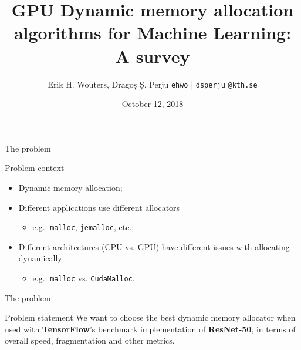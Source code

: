 \documentclass[10pt]{beamer}
\title{GPU Dynamic memory allocation algorithms for Machine Learning: A survey}
\author{Erik H. Wouters, Dragoș Ș. Perju \quad \texttt{ehwo} | \texttt{dsperju}  \texttt{@kth.se}}
\date{October 12, 2018}
\institute{KTH Royal University of Technology \quad Stockholm, Sweden}
\begin{document}
\maketitle



\begin{frame}[fragile]{The problem}


\begin{exampleblock}{Problem context}
 \begin{itemize}
 \item Dynamic memory allocation;
 \item Different applications use different allocators
     \begin{itemize}
         \item e.g.: \texttt{malloc}, \texttt{jemalloc}, etc.;
     \end{itemize}
 \item Different architectures (CPU vs. GPU) have different issues with allocating dynamically
     \begin{itemize}
         \item e.g.: \texttt{malloc} vs. \texttt{CudaMalloc}.
     \end{itemize}
 \end{itemize}
\end{exampleblock}
\end{frame}

\begin{frame}[fragile]{The problem}


\begin{alertblock}{Problem statement}
 We want to choose the best dynamic memory allocator when used with \textbf{TensorFlow}'s benchmark implementation of \textbf{ResNet-50}, in terms of overall speed, fragmentation and other metrics.
\end{alertblock}
\end{frame}
\end{document}
